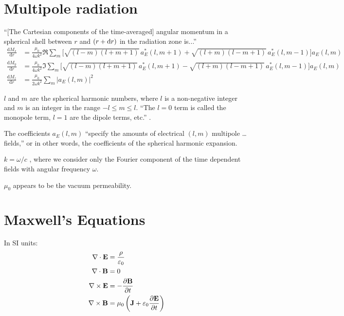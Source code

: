 \documentclass{book}
\newcommand{\deriv}[2]{\frac{\text{d}{#1}}{\text{d}{#2}}}
\newcommand{\pd}[2]{\frac{\partial {#1}}{\partial {#2}}}
\begin{document}
\section{Multipole radiation}

``[The Cartesian components of the time-averaged] angular momentum in a spherical shell between $r$ and $(r + {\rm d}r)$ in the radiation zone is...'' \citep[][see their Eqs. (9.141) to (9.143)]{Jackson1975}
\begin{equation}
    \begin{aligned}
        \deriv{M_x}{r}
            &= \frac{\mu_0}{4\omega k^2} \Re \sum_m \bigg[
                \sqrt{(l-m)(l+m+1)} \, a_E^\ast(l,m+1) +
                \sqrt{(l+m)(l-m+1)} \, a_E^\ast(l,m-1) \bigg] a_E(l,m) \\
        \deriv{M_y}{r}
            &= \frac{\mu_0}{4\omega k^2} \Im \sum_m \bigg[
                \sqrt{(l-m)(l+m+1)} \, a_E^\ast(l,m+1) -
                \sqrt{(l+m)(l-m+1)} \, a_E^\ast(l,m-1) \bigg] a_E(l,m) \\
        \deriv{M_z}{r}
            &= \frac{\mu_0}{2\omega k^2} \sum_m \left|a_E(l,m)\right|^2
    \end{aligned}
\end{equation}

$l$ and $m$ are the spherical harmonic numbers, where $l$ is a non-negative integer and $m$ is an integer in the range $-l \le m \le l$.
``The $l=0$ term is called the monopole term, $l=1$ are the dipole terms, etc.'' \citep[][\S4.1]{Jackson1975}.

The coefficients $a_E(l,m)$ ``specify the amounts of electrical $(l,m)$ multipole \dots fields,'' or in other words, the coefficients of the spherical harmonic expansion.

$k = \omega/c$ \citep[defined after Eq. (9.107) in][]{Jackson1975}, where we consider only the Fourier component of the time dependent fields with angular frequency $\omega$.

$\mu_0$ appears to be the vacuum permeability.

\section{Maxwell's Equations}

In SI units:
\begin{align}
    \nabla\cdot{\bf E} &= \frac{\rho}{\varepsilon_0} \\
    \nabla\cdot{\bf B} &= 0 \\
    \nabla\times{\bf E} &= -\pd{\bf B}{t} \\
    \nabla\times{\bf B} &= \mu_0\left({\bf J} + \varepsilon_0 \pd{\bf E}{t}\right)
\end{align}
\end{document}
